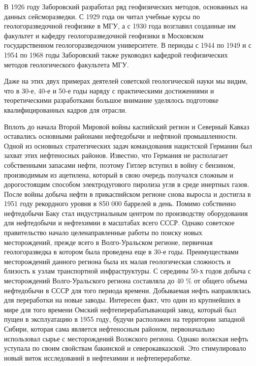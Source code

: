 В 1926 году Заборовский разработал ряд геофизических методов, основанных на данных сейсморазведки.
С 1929 года он читал учебные курсы по геологоразведочной геофизике в МГУ, а с 1930 года возглавил созданные им факультет и кафедру геологоразведочной геофизики в Московском государственном геологоразведочном университете.
В периоды с 1944 по 1949 и с 1954 по 1968 годы Заборовский также руководил кафедрой геофизических методов геологического факультета МГУ.

Даже на этих двух примерах деятелей советской геологической науки мы видим, что в 30-е, 40-е и 50-е годы наряду с практическими достижениями и теоретическими разработками большое внимание уделялось подготовке квалифицированных кадров для отрасли.

Вплоть до начала Второй Мировой войны каспийский регион и Северный Кавказ оставались основными районами нефтедобычи и нефтяной промышленности.
Одной из основных стратегических задач командования нацистской Германии был захват этих нефтеносных районов.
Известно, что Германия не располагает собственными запасами нефти, поэтому Гитлер вступил в войну с бензином, производимым из ацетилена, который в свою очередь получался сложным и дорогостоящим способом электродугового пиролиза угля в среде инертных газов.
После войны добыча нефти в прикаспийском регионе снова выросла и достигла в 1951 году рекордного уровня в 850 000 баррелей в день.
Помимо собственно нефтедобычи Баку стал индустриальным центром по производству оборудования для нефтедобычи и нефтехимии в масштабах всего СССР.
Однако советское правительство начало целенаправленные работы по поиску новых месторождений, прежде всего в Волго-Уральском регионе, первичная геологоразведка в котором была проведена еще в 30-е годы.
Преимуществами месторождений данного региона была их малая геологическая сложность и близость к узлам транспортной инфраструктуры.
С середины 50-х годов добыча с месторождений Волго-Уральского региона составляла до 40 \% от общего объема нефтедобычи в СССР для того периода времени.
Добываемая нефть направлялась для переработки на новые заводы.
Интересен факт, что один из крупнейших в мире для того времени Омский нефтеперерабатывающий завод, который был пущен в эксплуатацию в 1955 году, будучи расположен на территории западной Сибири, которая сама является нефтеносным районом, первоначально использовал сырье с месторождений Волжского региона.
Однако волжская нефть уступала по своим свойствам бакинской и северокавказской.
Это стимулировало новый виток исследований в нефтехимии и нефтепереработке.

